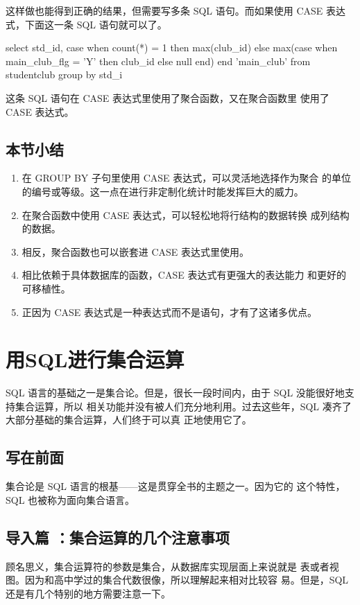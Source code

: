 这样做也能得到正确的结果，但需要写多条 SQL 语句。而如果使用
CASE 表达式，下面这一条 SQL 语句就可以了。

\begin{sqlc}
select std_id, 
	case when count(*) = 1
		then max(club_id) 
		else max(case when main_club_flg = 'Y' then club_id else null end)
    end 'main_club'
	from studentclub
    group by std_i
\end{sqlc}

这条 SQL 语句在 CASE 表达式里使用了聚合函数，又在聚合函数里
使用了 CASE 表达式。

\subsection{本节小结}
\begin{enumerate}
\item 在 GROUP BY 子句里使用 CASE 表达式，可以灵活地选择作为聚合
的单位的编号或等级。这一点在进行非定制化统计时能发挥巨大的威力。
\item 在聚合函数中使用 CASE 表达式，可以轻松地将行结构的数据转换
成列结构的数据。
\item 相反，聚合函数也可以嵌套进 CASE 表达式里使用。
\item 相比依赖于具体数据库的函数，CASE 表达式有更强大的表达能力
和更好的可移植性。
\item 正因为 CASE 表达式是一种表达式而不是语句，才有了这诸多优点。
\end{enumerate}

\section{用SQL进行集合运算}
SQL 语言的基础之一是集合论。但是，很长一段时间内，由于 SQL 没能很好地支持集合运算，所以
相关功能并没有被人们充分地利用。过去这些年，SQL 凑齐了大部分基础的集合运算，人们终于可以真
正地使用它了。
\subsection{写在前面}
集合论是 SQL 语言的根基——这是贯穿全书的主题之一。因为它的
这个特性，SQL 也被称为面向集合语言。

\subsection{导入篇 ：集合运算的几个注意事项\label{intro17}}
顾名思义，集合运算符的参数是集合，从数据库实现层面上来说就是
表或者视图。因为和高中学过的集合代数很像，所以理解起来相对比较容
易。但是，SQL 还是有几个特别的地方需要注意一下。

